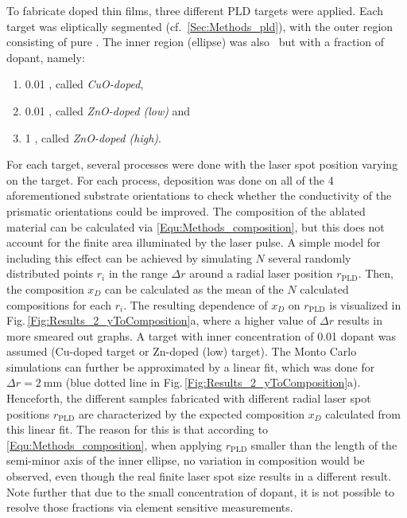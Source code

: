 To fabricate doped thin films, three different PLD targets were applied.
Each target was eliptically segmented (cf.~\ref{Sec:Methods_pld}), with the outer region consisting of pure .
The inner region (ellipse) was also \cro\ but with a fraction of dopant, namely:
\begin{enumerate}
    \item \qty{0.01}{\wtpercent} , called \emph{CuO-doped},
    \item \qty{0.01}{\wtpercent} , called \emph{ZnO-doped (low)} and
    \item \qty{1}{\wtpercent} , called \emph{ZnO-doped (high)}.
\end{enumerate}
For each target, several processes were done with the laser spot position varying on the target.
For each process, deposition was done on all of the 4 aforementioned substrate orientations to check whether the conductivity of the prismatic orientations could be improved.
The composition of the ablated material can be calculated via \eqref{Equ:Methods_composition}, but this does not account for the finite area illuminated by the laser pulse.
A simple model for including this effect can be achieved by simulating $N$ several randomly distributed points $r_i$ in the range $\Delta r$ around a radial laser position $r_\mathrm{PLD}$.
Then, the composition $x_D$ can be calculated as the mean of the $N$ calculated compositions for each $r_i$.
The resulting dependence of $x_D$ on $r_\mathrm{PLD}$ is visualized in Fig.\,\ref{Fig:Results_2_yToComposition}a, where a higher value of $\Delta r$ results in more smeared out graphs.
A target with inner concentration of \qty{0.01}{\wtpercent} dopant was assumed (Cu-doped target or Zn-doped (low) target).
The Monto Carlo simulations can further be approximated by a linear fit, which was done for $\Delta r=\qty{2}{\mm}$ (blue dotted line in Fig.\,\ref{Fig:Results_2_yToComposition}a).
Henceforth, the different samples fabricated with different radial laser spot positions $r_\mathrm{PLD}$ are characterized by the expected composition $x_D$ calculated from this linear fit.
The reason for this is that according to \eqref{Equ:Methods_composition}, when applying $r_\mathrm{PLD}$ smaller than the length of the semi-minor axis of the inner ellipse, no variation in composition would be observed, even though the real finite laser spot size results in a different result.
Note further that due to the small concentration of dopant, it is not possible to resolve those fractions via element sensitive measurements.
